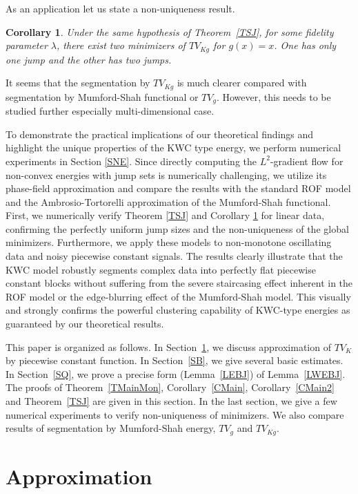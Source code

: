 \documentclass[12pt, reqno]{amsart}
\numberwithin{equation}{section}
\newtheorem{cor}[thm]{Corollary}
\begin{document}
As an application let us state a non-uniqueness result.
\begin{cor} \label{CSJ}
Under the same hypothesis of Theorem~\ref{TSJ}, for some fidelity parameter $\lambda$, there exist two minimizers of $TV_{Kg}$ for $g(x)=x$.
 One has only one jump and the other has two jumps.
\end{cor}

It seems that the segmentation by $TV_{Kg}$ is much clearer compared with segmentation by Mumford-Shah functional or $TV_g$.
 However, this needs to be studied further especially multi-dimensional case.

To demonstrate the practical implications of our theoretical findings and highlight the unique properties of the KWC type energy, we perform numerical experiments in Section \ref{SNE}. 
Since directly computing the $L^2$-gradient flow for non-convex energies with jump sets is numerically challenging, we utilize its phase-field approximation and compare the results with the standard ROF model and the Ambrosio-Tortorelli approximation of the Mumford-Shah functional.
First, we numerically verify Theorem \ref{TSJ} and Corollary \ref{CSJ} for linear data, confirming the perfectly uniform jump sizes and the non-uniqueness of the global minimizers. 
Furthermore, we apply these models to non-monotone oscillating data and noisy piecewise constant signals. The results clearly illustrate that the KWC model robustly segments complex data into perfectly flat piecewise constant blocks without suffering from the severe staircasing effect inherent in the ROF model or the edge-blurring effect of the Mumford-Shah model. 
This visually and strongly confirms the powerful clustering capability of KWC-type energies as guaranteed by our theoretical results.

This paper is organized as follows.
 In Section~\ref{SA}, we discuss approximation of $TV_K$ by piecewise constant function.
 In Section~\ref{SB}, we give several basic estimates.
 In Section~\ref{SQ}, we prove a precise form (Lemma~\ref{LEBJ}) of Lemma~\ref{LWEBJ}.
 The proofs of Theorem~\ref{TMainMon}, Corollary~\ref{CMain}, Corollary~\ref{CMain2} and Theorem~\ref{TSJ} are given in this section.
 In the last section, we give a few numerical experiments to verify non-uniqueness of minimizers.
 We also compare results of segmentation by Mumford-Shah energy, $TV_g$ and $TV_{Kg}$.
%
\section{Approximation} \label{SA} %
\end{document}
